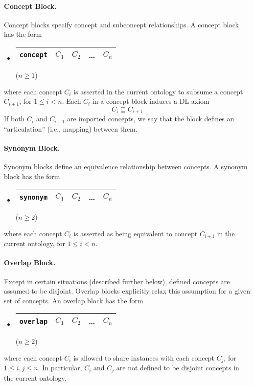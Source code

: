 \documentclass[11pt,onecolumn]{article}
\begin{document}
\paragraph{Concept Block.} Concept blocks specify concept and
subconcept relationships. A concept block has the form
\begin{itemize}
\item[] 
  \begin{tabular}{|l|l|l|l|l|}\hline
    \texttt{concept} & $C_1$ & $C_2$ & \dots & $C_n$ \\ \hline 
  \end{tabular} \hfill ($n \ge 1$)
\end{itemize}
where each concept $C_i$ is asserted in the current ontology to
subsume a concept $C_{i+1}$, for $1 \le i < n$. Each $C_i$ in a
concept block induces a DL axiom \[C_i \sqsubseteq C_{i+1}\] If both
$C_i$ and $C_{i+1}$ are imported concepts, we say that the block
defines an ``articulation'' (i.e., mapping) between them.


\paragraph{Synonym Block.} Synonym blocks define an equivalence
relationship between concepts.  A synonym block has the form
\begin{itemize}
\item[] 
  \begin{tabular}{|l|l|l|l|l|}\hline
    \texttt{synonym} & $C_1$ & $C_2$ & \dots & $C_n$ \\ \hline 
  \end{tabular} \hfill ($n \ge 2$)
\end{itemize}
where each concept $C_i$ is asserted as being equivalent to concept
$C_{i+1}$ in the current ontology, for $1 \le i < n$. 


\paragraph{Overlap Block.} Except in certain situations (described
further below), defined concepts are assumed to be disjoint.  Overlap
blocks explicitly relax this assumption for a given set of
concepts. An overlap block has the form
\begin{itemize}
\item[] 
  \begin{tabular}{|l|l|l|l|l|}\hline
    \texttt{overlap} & $C_1$ & $C_2$ & \dots & $C_n$ \\ \hline 
  \end{tabular} \hfill ($n \ge 2$)
\end{itemize}
where each concept $C_i$ is allowed to share instances with each
concept $C_j$, for $1 \le i,j \le n$. In particular, $C_i$ and $C_j$
are not defined to be disjoint concepts in the current ontology. 
\end{document}
